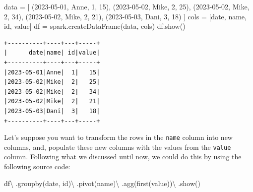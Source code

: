 \documentclass[
  11pt,
  letterpaper,
  DIV=11,
  numbers=noendperiod]{scrreprt}
\newenvironment{Shaded}{\begin{snugshade}}{\end{snugshade}}
\newcommand{\DecValTok}[1]{\textcolor[rgb]{0.68,0.00,0.00}{#1}}
\newcommand{\NormalTok}[1]{\textcolor[rgb]{0.00,0.23,0.31}{#1}}
\newcommand{\OperatorTok}[1]{\textcolor[rgb]{0.37,0.37,0.37}{#1}}
\newcommand{\StringTok}[1]{\textcolor[rgb]{0.13,0.47,0.30}{#1}}
\begin{document}
\begin{Shaded}
\begin{Highlighting}[]
\NormalTok{data }\OperatorTok{=}\NormalTok{ [}
\NormalTok{    (}\StringTok{\textquotesingle{}2023{-}05{-}01\textquotesingle{}}\NormalTok{, }\StringTok{\textquotesingle{}Anne\textquotesingle{}}\NormalTok{, }\DecValTok{1}\NormalTok{, }\DecValTok{15}\NormalTok{),}
\NormalTok{    (}\StringTok{\textquotesingle{}2023{-}05{-}02\textquotesingle{}}\NormalTok{, }\StringTok{\textquotesingle{}Mike\textquotesingle{}}\NormalTok{, }\DecValTok{2}\NormalTok{, }\DecValTok{25}\NormalTok{),}
\NormalTok{    (}\StringTok{\textquotesingle{}2023{-}05{-}02\textquotesingle{}}\NormalTok{, }\StringTok{\textquotesingle{}Mike\textquotesingle{}}\NormalTok{, }\DecValTok{2}\NormalTok{, }\DecValTok{34}\NormalTok{),}
\NormalTok{    (}\StringTok{\textquotesingle{}2023{-}05{-}02\textquotesingle{}}\NormalTok{, }\StringTok{\textquotesingle{}Mike\textquotesingle{}}\NormalTok{, }\DecValTok{2}\NormalTok{, }\DecValTok{21}\NormalTok{),}
\NormalTok{    (}\StringTok{\textquotesingle{}2023{-}05{-}03\textquotesingle{}}\NormalTok{, }\StringTok{\textquotesingle{}Dani\textquotesingle{}}\NormalTok{, }\DecValTok{3}\NormalTok{, }\DecValTok{18}\NormalTok{)}
\NormalTok{]}
\NormalTok{cols }\OperatorTok{=}\NormalTok{ [}\StringTok{\textquotesingle{}date\textquotesingle{}}\NormalTok{, }\StringTok{\textquotesingle{}name\textquotesingle{}}\NormalTok{, }\StringTok{\textquotesingle{}id\textquotesingle{}}\NormalTok{, }\StringTok{\textquotesingle{}value\textquotesingle{}}\NormalTok{]}
\NormalTok{df }\OperatorTok{=}\NormalTok{ spark.createDataFrame(data, cols)}
\NormalTok{df.show()}
\end{Highlighting}
\end{Shaded}

\begin{verbatim}
+----------+----+---+-----+
|      date|name| id|value|
+----------+----+---+-----+
|2023-05-01|Anne|  1|   15|
|2023-05-02|Mike|  2|   25|
|2023-05-02|Mike|  2|   34|
|2023-05-02|Mike|  2|   21|
|2023-05-03|Dani|  3|   18|
+----------+----+---+-----+
\end{verbatim}

Let's suppose you want to transform the rows in the \texttt{name} column
into new columns, and, populate these new columns with the values from
the \texttt{value} column. Following what we discussed until now, we
could do this by using the following source code:

\begin{Shaded}
\begin{Highlighting}[]
\NormalTok{df}\OperatorTok{\textbackslash{}}
\NormalTok{    .groupby(}\StringTok{\textquotesingle{}date\textquotesingle{}}\NormalTok{, }\StringTok{\textquotesingle{}id\textquotesingle{}}\NormalTok{)}\OperatorTok{\textbackslash{}}
\NormalTok{    .pivot(}\StringTok{\textquotesingle{}name\textquotesingle{}}\NormalTok{)}\OperatorTok{\textbackslash{}}
\NormalTok{    .agg(first(}\StringTok{\textquotesingle{}value\textquotesingle{}}\NormalTok{))}\OperatorTok{\textbackslash{}}
\NormalTok{    .show()}
\end{Highlighting}
\end{Shaded}
\end{document}
